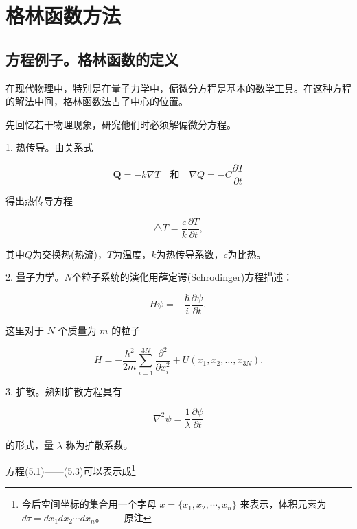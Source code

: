 \chapter{格林函数方法}

\section{方程例子。格林函数的定义}

在现代物理中，特别是在量子力学中，偏微分方程是基本的数学工具。在这种方程的解法中间，格林函数法占了中心的位置。

先回忆若干物理现象，研究他们时必须解偏微分方程。

1. 热传导。由关系式

\begin{equation*}
\pmb {Q} = - k \nabla T \quad \text {和} \quad \nabla Q = - C \frac {\partial T}{\partial t}
\end{equation*}

得出热传导方程

\begin{equation*}
\triangle T = \frac {c}{k} \frac {\partial T}{\partial t},\tag{5.1}
\end{equation*}

其中$Q$为交换热(热流)，$T$为温度，$k$为热传导系数，$c$为比热。

2. 量子力学。$N$个粒子系统的演化用薛定谔(Schrodinger)方程描述：

\begin{equation*}
H \psi = - \frac {\hbar}{i} \frac {\partial \psi}{\partial t},\tag{5.2}
\end{equation*}

这里对于 $N$ 个质量为 $m$ 的粒子

\begin{equation*}
H = - \frac {\hbar^ {2}}{2 m} \sum_ {i = 1} ^ {3 N} \frac {\partial^ {2}}{\partial x _ {i} ^ {2}} + U (x _ {1}, x _ {2}, \dots , x _ {3 N}).
\end{equation*}

3. 扩散。熟知扩散方程具有

\begin{equation*}
\nabla^ {2} \psi = \frac {1}{\lambda} \frac {\partial \psi}{\partial t}\tag{5.3}
\end{equation*}

的形式，量 $\lambda$ 称为扩散系数。

方程(5.1)——(5.3)可以表示成\footnote{今后空间坐标的集合用一个字母 $x=\{x_1,x_2,\cdots,x_n\}$ 来表示，体积元素为 $d\tau=dx_1dx_2\cdots dx_n$。——原注}

